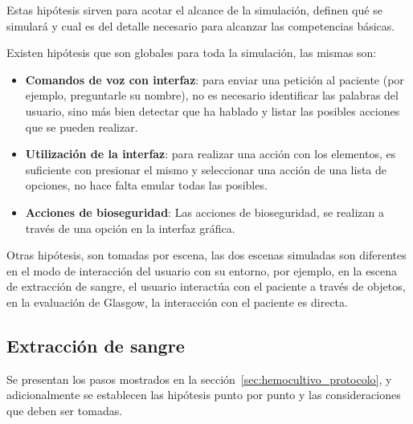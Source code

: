 Estas hipótesis sirven para acotar el alcance de la simulación, definen qué se
simulará y cual es del detalle necesario para alcanzar las competencias básicas.

Existen hipótesis que son globales para toda la simulación, las mismas son:

\begin{itemize}

    \item \textbf{Comandos de voz con interfaz}: para enviar una petición al
        paciente (por ejemplo, preguntarle su nombre), no es necesario
        identificar las palabras del usuario, sino más bien detectar que ha
        hablado y listar las posibles acciones que se pueden realizar.

    \item \textbf{Utilización de la interfaz}: para realizar una acción con los
        elementos, es suficiente con presionar el mismo y seleccionar una acción
        de una lista de opciones, no hace falta emular todas las posibles.

    \item \textbf{Acciones de bioseguridad}: Las
        acciones de bioseguridad, se realizan a través de una opción en la
        interfaz gráfica.

\end{itemize}

Otras hipótesis, son tomadas por escena, las dos escenas simuladas son
diferentes en el modo de interacción del usuario con su entorno, por ejemplo, en
la escena de extracción de sangre, el usuario interactúa con el paciente a
través de objetos, en la evaluación de Glasgow, la interacción con el paciente
es directa.

\subsection{Extracción de sangre}

Se presentan los pasos mostrados en la sección~\ref{sec:hemocultivo_protocolo},
y adicionalmente se establecen las hipótesis punto por punto y las
consideraciones que deben ser tomadas.


